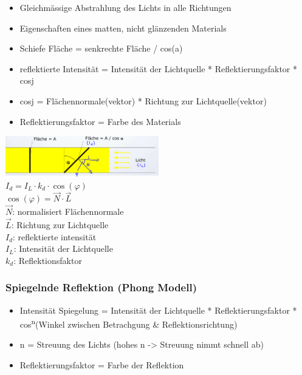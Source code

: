\begin{itemize}
    \item Gleichmässige Abstrahlung des Lichts in alle Richtungen
    \item Eigenschaften eines matten, nicht glänzenden Materials
    \item Schiefe Fläche = senkrechte Fläche / cos(a)
    \item reflektierte Intensität = Intensität der Lichtquelle * Reflektierungsfaktor * cosj \\
    \item cosj = Flächennormale(vektor) * Richtung zur Lichtquelle(vektor) \\
    \item Reflektierungsfaktor = Farbe des Materials
\end{itemize}

\includegraphics[width=0.5\textwidth]{assets/energy-model.png}\\

$I_d = I_L \cdot k_d \cdot \cos(\varphi)$ \\
$\cos(\varphi) = \vec{N} \cdot \vec{L}$ \\

$\vec{N}$: normalisiert Flächennormale \\
$\vec{L}$: Richtung zur Lichtquelle \\
$I_d$: reflektierte intensität \\
$I_L$: Intensität der Lichtquelle \\
$k_d$: Reflektionsfaktor \\

\subsubsection{Spiegelnde Reflektion (Phong Modell)}

\begin{itemize}
    \item[] Intensität Spiegelung = Intensität der Lichtquelle * Reflektierungsfaktor * cos\textsuperscript{n}(Winkel zwischen Betrachgung \& Reflektionsrichtung)
    \item[] n = Streuung des Lichts (hohes n -> Streuung nimmt schnell ab)
    \item[] Reflektierungsfaktor = Farbe der Reflektion
\end{itemize}

